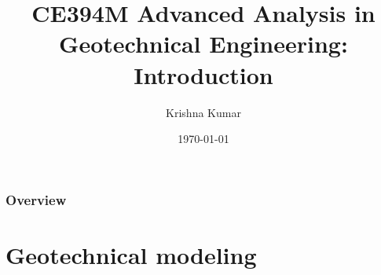 \documentclass[notes]{beamer}
\title[CE394M: Intro to geotech analysis]{CE394M Advanced Analysis in Geotechnical Engineering: Introduction}
\author{Krishna Kumar} %
\institute[UT Austin] %
{
University of Texas at Austin \\
\medskip
\textit{
  \url{krishnak@utexas.edu}} %
}
\date{\today} %
\begin{document}
\begin{frame}
\titlepage %
\end{frame}

\begin{frame}
 \frametitle{Overview}
 \tableofcontents
\end{frame}


\section{Geotechnical modeling}
\end{document}

